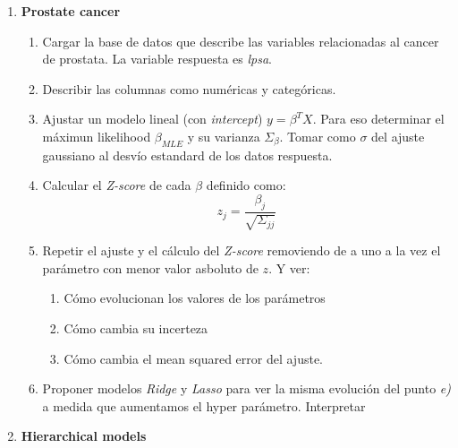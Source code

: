 \documentclass[12pt]{paper}
\begin{document}
\begin{enumerate}
\item \textbf{Prostate cancer}

\begin{enumerate}
\item Cargar la base de datos que describe las variables relacionadas al cancer de prostata. La variable respuesta es \textit{lpsa}. 
\item Describir las columnas como numéricas y categóricas.
\item Ajustar un modelo lineal (con \textit{intercept}) $y =\beta^{T}X$. Para eso determinar el máximun likelihood $\beta_{MLE}$ y su varianza $\Sigma_{\beta}$. Tomar como $\sigma$ del ajuste gaussiano al desvío estandard de los datos respuesta.
\item Calcular el \textit{Z-score} de cada $\beta$ definido como:
$$
z_{j} = \frac{\beta_{j}}{\sqrt{ \Sigma_{jj}}}
$$
\item Repetir el ajuste y el cálculo del \textit{Z-score} removiendo de a uno a la vez el parámetro con menor valor asboluto de $z$. Y ver:
\begin{enumerate}
\item Cómo evolucionan los valores de los parámetros
\item Cómo cambia su incerteza
\item Cómo cambia el mean squared error del ajuste.
\end{enumerate}

\item Proponer modelos \textit{Ridge} y \textit{Lasso} para ver la misma evolución del punto \textit{e)} a medida que aumentamos el hyper parámetro. Interpretar
\end{enumerate}
\newpage
\item \textbf{Hierarchical models}


\end{enumerate}
\end{document}
